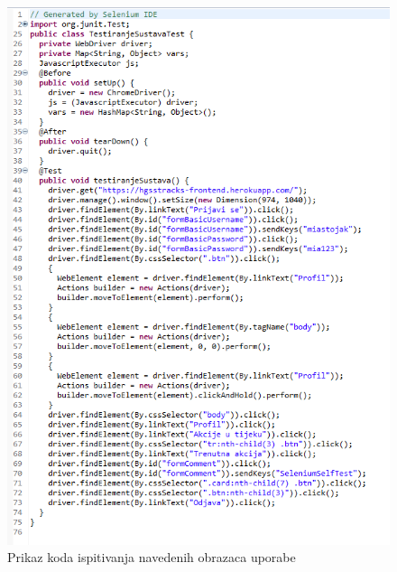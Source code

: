 			 \begin{figure}[h!]
			 	\centering
			 	\includegraphics[width=\linewidth]{./slike/IspitivanjeSustava.png}
			 	\caption{Prikaz koda ispitivanja navedenih obrazaca uporabe}
			 \end{figure}
			
			\eject 
			
